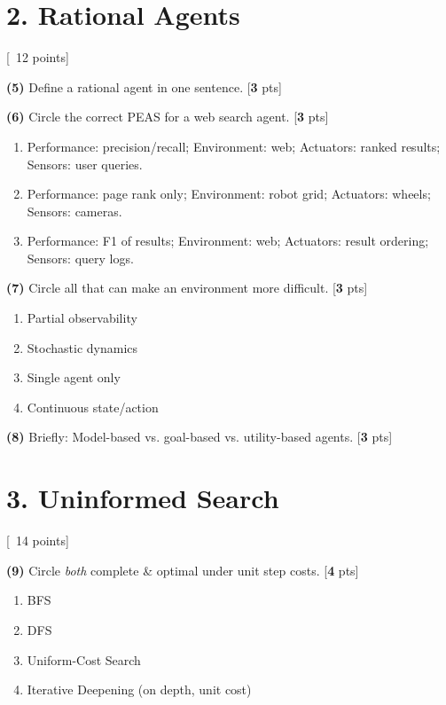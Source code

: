 \documentclass[11pt]{article}
\newcommand{\pts}[1]{\hfill{\small[\textbf{#1} pts]}}
\begin{document}
\vspace{0.6em}
\section*{2. Rational Agents} \hfill {\small[~12 points]}

\noindent\textbf{(5)} Define a rational agent in one sentence. \pts{3}

\noindent\textbf{(6)} Circle the correct PEAS for a web search agent. \pts{3}
\begin{enumerate}[label=(\alph*)]
\item Performance: precision/recall; Environment: web; Actuators: ranked results; Sensors: user queries.
\item Performance: page rank only; Environment: robot grid; Actuators: wheels; Sensors: cameras.
\item Performance: F1 of results; Environment: web; Actuators: result ordering; Sensors: query logs.
\end{enumerate}

\noindent\textbf{(7)} Circle all that can make an environment more difficult. \pts{3}
\begin{enumerate}[label=(\alph*)]
\item Partial observability
\item Stochastic dynamics
\item Single agent only
\item Continuous state/action
\end{enumerate}

\noindent\textbf{(8)} Briefly: Model-based vs. goal-based vs. utility-based agents. \pts{3}

\vspace{0.6em}
\section*{3. Uninformed Search} \hfill {\small[~14 points]}

\noindent\textbf{(9)} Circle \emph{both} complete \& optimal under unit step costs. \pts{4}
\begin{enumerate}[label=(\alph*)]
\item BFS
\item DFS
\item Uniform-Cost Search
\item Iterative Deepening (on depth, unit cost)
\end{enumerate}
\end{document}
